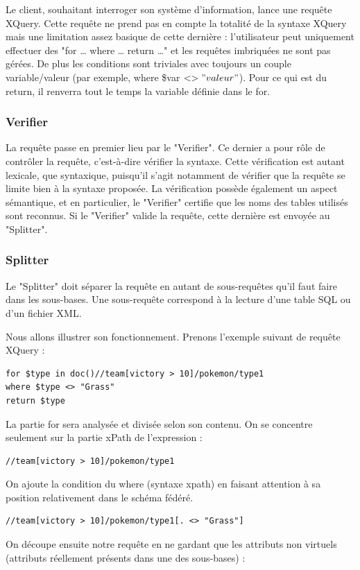 Le client, souhaitant interroger son système d'information, lance une requête XQuery. Cette requête ne prend pas en compte la totalité de la syntaxe XQuery mais une limitation assez basique de cette dernière : l'utilisateur peut uniquement effectuer des "for … where … return …" et les requêtes imbriquées ne sont pas gérées. De plus les conditions sont triviales avec toujours un couple variable/valeur (par exemple, where \$var $<> "valeur"$). Pour ce qui est du return, il renverra tout le temps la variable définie dans le for.

\subsubsection{Verifier}

La requête passe en premier lieu par le "Verifier". Ce dernier a pour rôle de contrôler la requête, c'est-à-dire vérifier la syntaxe. Cette vérification est autant lexicale, que syntaxique, puisqu'il s'agit notamment de vérifier que la requête se limite bien à la syntaxe proposée. La vérification possède également un aspect sémantique, et en particulier, le "Verifier" certifie que les noms des tables utilisés sont reconnus. Si le "Verifier" valide la requête, cette dernière est envoyée au "Splitter".

\subsubsection{Splitter}

Le "Splitter" doit séparer la requête en autant de sous-requêtes qu'il faut faire dans les sous-bases. Une sous-requête correspond à la lecture d'une table SQL ou d'un fichier XML. 

Nous allons illustrer son fonctionnement. Prenons l'exemple suivant de requête XQuery :

\begin{lstlisting}
for $type in doc()//team[victory > 10]/pokemon/type1
where $type <> "Grass"
return $type
\end{lstlisting}

La partie for sera analysée et divisée selon son contenu. On se concentre seulement sur la partie xPath de l'expression :
\begin{lstlisting}
//team[victory > 10]/pokemon/type1
\end{lstlisting}
On ajoute la condition du where (syntaxe xpath) en faisant attention à sa position relativement dans le schéma fédéré.
\begin{lstlisting}
//team[victory > 10]/pokemon/type1[. <> "Grass"]
\end{lstlisting}
On découpe ensuite notre requête en ne gardant que les attributs non virtuels (attributs réellement présents dans une des sous-bases) :

